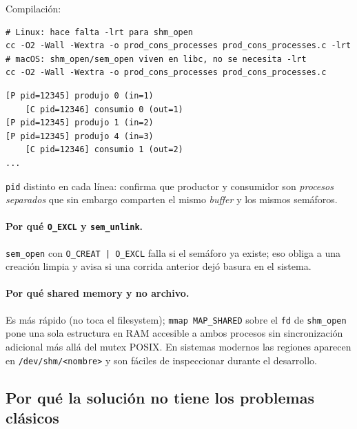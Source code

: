 \documentclass[11pt,a4paper]{article}
\begin{document}
Compilación:

\begin{lstlisting}
# Linux: hace falta -lrt para shm_open
cc -O2 -Wall -Wextra -o prod_cons_processes prod_cons_processes.c -lrt
# macOS: shm_open/sem_open viven en libc, no se necesita -lrt
cc -O2 -Wall -Wextra -o prod_cons_processes prod_cons_processes.c
\end{lstlisting}

\begin{lstlisting}[style=textstyle]
[P pid=12345] produjo 0 (in=1)
    [C pid=12346] consumio 0 (out=1)
[P pid=12345] produjo 1 (in=2)
[P pid=12345] produjo 4 (in=3)
    [C pid=12346] consumio 1 (out=2)
...
\end{lstlisting}

\texttt{pid} distinto en cada línea: confirma que productor y consumidor
son \emph{procesos separados} que sin embargo comparten el mismo
\emph{buffer} y los mismos semáforos.

\paragraph{Por qué \texttt{O\_EXCL} y \texttt{sem\_unlink}.}
\texttt{sem\_open} con \texttt{O\_CREAT | O\_EXCL} falla si el semáforo
ya existe; eso obliga a una creación limpia y avisa si una corrida
anterior dejó basura en el sistema.

\paragraph{Por qué shared memory y no archivo.} Es más rápido (no toca
el filesystem); \texttt{mmap MAP\_SHARED} sobre el \texttt{fd} de
\texttt{shm\_open} pone una sola estructura en RAM accesible a ambos
procesos sin sincronización adicional más allá del mutex POSIX. En
sistemas modernos las regiones aparecen en \texttt{/dev/shm/<nombre>} y
son fáciles de inspeccionar durante el desarrollo.

\subsection*{Por qué la solución no tiene los problemas clásicos}
\end{document}
